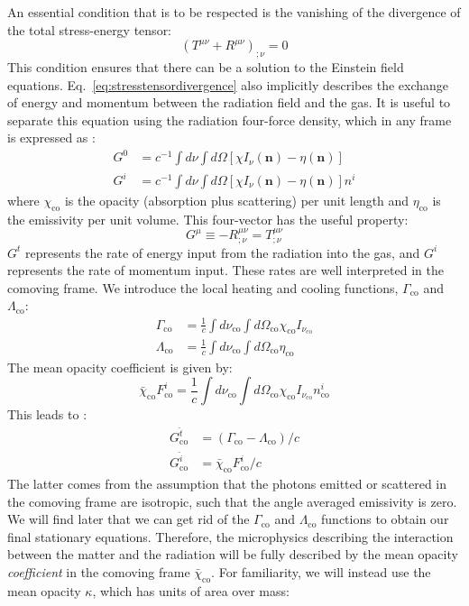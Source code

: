\documentclass[../main.tex]{subfiles}
\begin{document}
An essential condition that is to be respected is the vanishing of the divergence of the total stress-energy tensor:
\begin{equation}\label{eq:stresstensordivergence}
    (T^{\mu\nu}+R^{\mu\nu})_{;\nu}=0
\end{equation}
This condition ensures that there can be a solution to the Einstein field equations.  Eq.~\eqref{eq:stresstensordivergence} also implicitly describes the exchange of energy and momentum between the radiation field and the gas. It is useful to separate this equation using the radiation four-force density, which in any frame is expressed as \citep{MihalasMihalas1984}:
\begin{align}
    G^0&=c^{-1}\int d\nu\int d\Omega[\chi I_\nu(\bm{n})-\eta(\bm{n})]\\ 
    G^i&=c^{-1}\int d\nu\int d\Omega[\chi I_\nu(\bm{n})-\eta(\bm{n})]n^i
\end{align}
where $\chi_\text{co}$ is the opacity (absorption plus scattering) per unit length and $\eta_\text{co}$ is the emissivity per unit volume. This four-vector has the useful property:
\begin{equation}
    G^\mu\equiv -R^{\mu\nu}_{;\nu}=T^{\mu\nu}_{;\nu}
\end{equation}
$G^t$ represents the rate of energy input from the radiation into the gas, and $G^i$ represents the rate of momentum input.  These rates are well interpreted in the comoving frame. We introduce the local heating and cooling functions, $\Gamma_\text{co}$ and $\Lambda_\text{co}$:
\begin{align}
    \Gamma_\text{co}&=\frac{1}{c}\int d\nu_\text{co}\int d\Omega_\text{co}\chi_\text{co}I_{\nu_\text{co}}\\
    \Lambda_\text{co}&=\frac{1}{c}\int d\nu_\text{co}\int d\Omega_\text{co}\eta_\text{co}
\end{align}
 The mean opacity coefficient is given by:
\begin{equation}
    \bar{\chi}_\text{co}F^i_\text{co}=\frac{1}{c}\int d\nu_\text{co}\int d\Omega_\text{co}\chi_\text{co}I_{\nu_\text{co}}n^i_\text{co}
\end{equation}
This leads to :
\begin{align}
    G^{\hat{t}}_\text{co}&=(\Gamma_\text{co}-\Lambda_\text{co})/c\\
    G^{\hat{i}}_\text{co}&=\bar{\chi}_\text{co}F^i_\text{co}/c
\end{align}
The latter comes from the assumption that the photons emitted or scattered in the comoving frame are isotropic, such that the angle averaged emissivity is zero. We will find later that we can get rid of the $\Gamma_\text{co}$ and $\Lambda_\text{co}$ functions to obtain our final stationary equations.  Therefore, the microphysics describing the interaction between the matter and the radiation will be fully described by the mean opacity \textit{coefficient} in the comoving frame $\bar{\chi}_\text{co}$.  For familiarity, we will instead use the mean opacity $\kappa$, which has units of area over mass:
\end{document}
